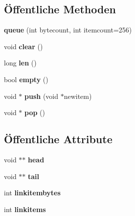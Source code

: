 \subsection*{Öffentliche Methoden}
\begin{DoxyCompactItemize}
\item 
\hypertarget{classtetgenmesh_1_1queue_a2000ba9bf2ea76635f06cf20c5ba7eae}{{\bfseries queue} (int bytecount, int itemcount=256)}\label{classtetgenmesh_1_1queue_a2000ba9bf2ea76635f06cf20c5ba7eae}

\item 
\hypertarget{classtetgenmesh_1_1queue_a30e7befe233d0421ae6bfdb846996300}{void {\bfseries clear} ()}\label{classtetgenmesh_1_1queue_a30e7befe233d0421ae6bfdb846996300}

\item 
\hypertarget{classtetgenmesh_1_1queue_acb5b501909b61fa5dd0a06ff583c030b}{long {\bfseries len} ()}\label{classtetgenmesh_1_1queue_acb5b501909b61fa5dd0a06ff583c030b}

\item 
\hypertarget{classtetgenmesh_1_1queue_a5b89d05d19516c2b712501eb696ff1b4}{bool {\bfseries empty} ()}\label{classtetgenmesh_1_1queue_a5b89d05d19516c2b712501eb696ff1b4}

\item 
\hypertarget{classtetgenmesh_1_1queue_aa871e54335d68dc45100a0c498d2602d}{void $\ast$ {\bfseries push} (void $\ast$newitem)}\label{classtetgenmesh_1_1queue_aa871e54335d68dc45100a0c498d2602d}

\item 
\hypertarget{classtetgenmesh_1_1queue_aeeb4ecff4f27306d5f24b73522d65661}{void $\ast$ {\bfseries pop} ()}\label{classtetgenmesh_1_1queue_aeeb4ecff4f27306d5f24b73522d65661}

\end{DoxyCompactItemize}
\subsection*{Öffentliche Attribute}
\begin{DoxyCompactItemize}
\item 
\hypertarget{classtetgenmesh_1_1queue_a9ed42262f1e574b811e6fb5c1647f56d}{void $\ast$$\ast$ {\bfseries head}}\label{classtetgenmesh_1_1queue_a9ed42262f1e574b811e6fb5c1647f56d}

\item 
\hypertarget{classtetgenmesh_1_1queue_afa964c94b74fa497186c0bf1ea3eef98}{void $\ast$$\ast$ {\bfseries tail}}\label{classtetgenmesh_1_1queue_afa964c94b74fa497186c0bf1ea3eef98}

\item 
\hypertarget{classtetgenmesh_1_1queue_a2be43a9fff3837cfc54faea5f2813442}{int {\bfseries linkitembytes}}\label{classtetgenmesh_1_1queue_a2be43a9fff3837cfc54faea5f2813442}

\item 
\hypertarget{classtetgenmesh_1_1queue_a56dae24717089a6ff2b28caef1f16800}{int {\bfseries linkitems}}\label{classtetgenmesh_1_1queue_a56dae24717089a6ff2b28caef1f16800}

\end{DoxyCompactItemize}


